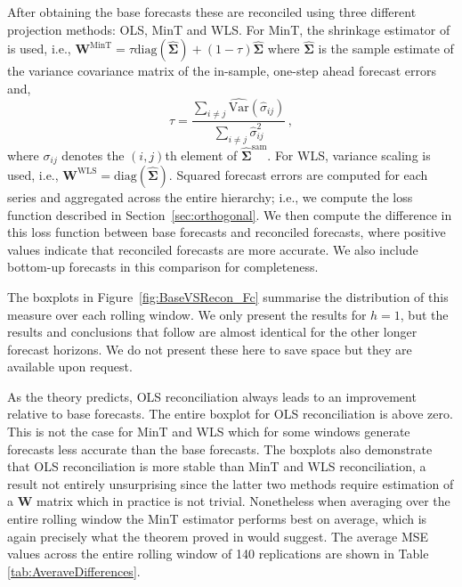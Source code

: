 \documentclass[12pt]{article}
\def\var{\text{Var}}
\theoremstyle{definition}
\begin{document}
After obtaining the base forecasts these are reconciled using three different projection methods: OLS, MinT and WLS.  {\color{blue}For MinT, the shrinkage estimator of \cite{Schafer2005} is used, i.e., $\bm{W}^{\text{MinT}} = \tau\text{diag}(\hat{\bm{\Sigma}}) + (1-\tau)\hat{\bm{\Sigma}}$  where $\hat{\bm{\Sigma}}$ is the sample estimate of the variance covariance matrix of the in-sample, one-step ahead forecast errors and,
\begin{equation*}
\tau = \frac{\sum_{i \neq j}\hat{\var}(\hat{\sigma}_{ij})}{\sum_{i \neq j}{\hat{\sigma}}^2_{ij}}\,,
\end{equation*}
where $\sigma_{ij}$ denotes the $(i,j)$th element of $\hat{\bm{\Sigma}}^{\text{sam}}$.  For WLS, variance scaling is used, i.e., $\bm{W}^{\text{WLS}}=\text{diag}(\hat{\bm{\Sigma}})$.} Squared forecast errors are computed for each series and aggregated across the entire hierarchy; i.e., we compute the loss function described in Section~\ref{sec:orthogonal}. We then compute the difference in this loss function between base forecasts and reconciled forecasts, where positive values indicate that reconciled forecasts are more accurate. We also include bottom-up forecasts in this comparison for completeness.

The boxplots in Figure~\ref{fig:BaseVSRecon_Fc} summarise the distribution of this measure over each rolling window. We only present the results for $h=1$, but the results and conclusions that follow are almost identical for the other longer forecast horizons. We do not present these here to save space but they are available upon request.

As the theory predicts, OLS reconciliation always leads to an improvement relative to base forecasts. The entire boxplot for OLS reconciliation is above zero. This is not the case for MinT and WLS which for some windows generate forecasts less accurate than the base forecasts. The boxplots also demonstrate that OLS reconciliation is more stable than MinT and WLS reconciliation, a result not entirely unsurprising since the latter two methods require estimation of a $\bm{W}$ matrix which in practice is not trivial. Nonetheless when averaging over the entire rolling window the MinT estimator performs best on average, which is again precisely what the theorem proved in \citet{WicEtAl2019} would suggest. The average MSE values across the entire rolling window of 140 replications are shown in Table \ref{tab:AveraveDifferences}.
\end{document}
